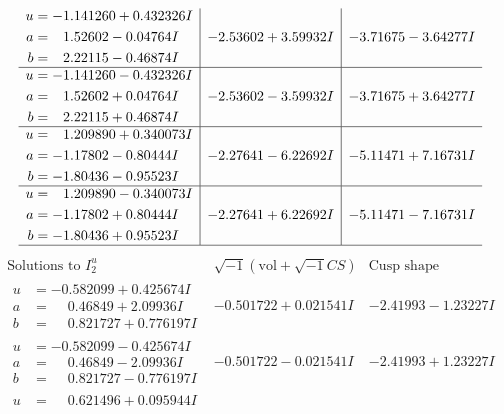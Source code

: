 \documentclass[1p]{elsarticle_modified}
\theoremstyle{definition}
\newcommand{\I}{\sqrt{-1}}
\begin{document}
$$\begin{array}{c|c|c}
\begin{aligned}
u &= -1.141260 + 0.432326 I \\
a &= \phantom{-}1.52602 - 0.04764 I \\
b &= \phantom{-}2.22115 - 0.46874 I\end{aligned}
 & -2.53602 + 3.59932 I & -3.71675 - 3.64277 I \\ \hline\begin{aligned}
u &= -1.141260 - 0.432326 I \\
a &= \phantom{-}1.52602 + 0.04764 I \\
b &= \phantom{-}2.22115 + 0.46874 I\end{aligned}
 & -2.53602 - 3.59932 I & -3.71675 + 3.64277 I \\ \hline\begin{aligned}
u &= \phantom{-}1.209890 + 0.340073 I \\
a &= -1.17802 - 0.80444 I \\
b &= -1.80436 - 0.95523 I\end{aligned}
 & -2.27641 - 6.22692 I & -5.11471 + 7.16731 I \\ \hline\begin{aligned}
u &= \phantom{-}1.209890 - 0.340073 I \\
a &= -1.17802 + 0.80444 I \\
b &= -1.80436 + 0.95523 I\end{aligned}
 & -2.27641 + 6.22692 I & -5.11471 - 7.16731 I\\
 \hline 
 \end{array}$$\newpage$$\begin{array}{c|c|c}  
\text{Solutions to }I^u_{2}& \I (\text{vol} + \sqrt{-1}CS) & \text{Cusp shape}\\
 \hline 
\begin{aligned}
u &= -0.582099 + 0.425674 I \\
a &= \phantom{-}0.46849 + 2.09936 I \\
b &= \phantom{-}0.821727 + 0.776197 I\end{aligned}
 & -0.501722 + 0.021541 I & -2.41993 - 1.23227 I \\ \hline\begin{aligned}
u &= -0.582099 - 0.425674 I \\
a &= \phantom{-}0.46849 - 2.09936 I \\
b &= \phantom{-}0.821727 - 0.776197 I\end{aligned}
 & -0.501722 - 0.021541 I & -2.41993 + 1.23227 I \\ \hline\begin{aligned}
u &= \phantom{-}0.621496 + 0.095944 I \\

\end{aligned}
\end{array}$$
\end{document}
